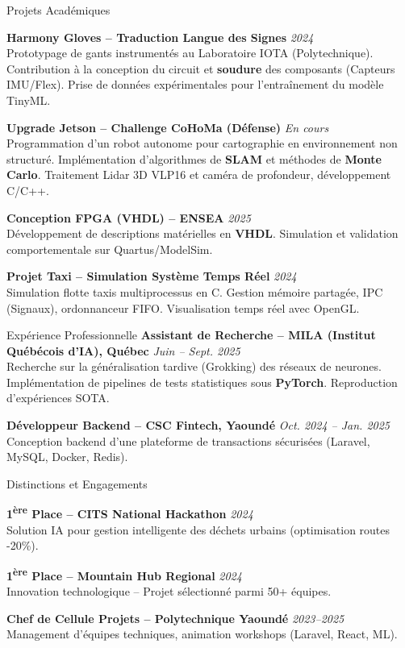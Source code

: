 \documentclass[10pt]{resume}
\begin{document}
\begin{rSection}{Projets Académiques}

{\bf Harmony Gloves -- Traduction Langue des Signes} \hfill {\em 2024}\\
Prototypage de gants instrumentés au Laboratoire IOTA (Polytechnique). Contribution à la conception du circuit et \textbf{soudure} des composants (Capteurs IMU/Flex). Prise de données expérimentales pour l'entraînement du modèle TinyML.

{\bf Upgrade Jetson -- Challenge CoHoMa (Défense)} \hfill {\em En cours}\\
Programmation d'un robot autonome pour cartographie en environnement non structuré. Implémentation d'algorithmes de \textbf{SLAM} et méthodes de \textbf{Monte Carlo}. Traitement Lidar 3D VLP16 et caméra de profondeur, développement C/C++.

{\bf Conception FPGA (VHDL) -- ENSEA} \hfill {\em 2025}\\
Développement de descriptions matérielles en \textbf{VHDL}. Simulation et validation comportementale sur Quartus/ModelSim.

{\bf Projet Taxi -- Simulation Système Temps Réel} \hfill {\em 2024}\\
Simulation flotte taxis multiprocessus en C. Gestion mémoire partagée, IPC (Signaux), ordonnanceur FIFO. Visualisation temps réel avec OpenGL.

\end{rSection}

\begin{rSection}{Expérience Professionnelle}
{\bf Assistant de Recherche -- MILA (Institut Québécois d'IA), Québec} \hfill {\em Juin -- Sept. 2025}\\
Recherche sur la généralisation tardive (Grokking) des réseaux de neurones. Implémentation de pipelines de tests statistiques sous \textbf{PyTorch}. Reproduction d'expériences SOTA.

{\bf Développeur Backend -- CSC Fintech, Yaoundé} \hfill {\em Oct. 2024 -- Jan. 2025}\\
Conception backend d'une plateforme de transactions sécurisées (Laravel, MySQL, Docker, Redis).
\end{rSection}

\begin{rSection}{Distinctions et Engagements}

\textbf{1\textsuperscript{ère} Place -- CITS National Hackathon} \hfill \textit{2024} \\
Solution IA pour gestion intelligente des déchets urbains (optimisation routes -20\%).

\textbf{1\textsuperscript{ère} Place -- Mountain Hub Regional} \hfill \textit{2024} \\
Innovation technologique -- Projet sélectionné parmi 50+ équipes.

\textbf{Chef de Cellule Projets -- Polytechnique Yaoundé} \hfill \textit{2023--2025} \\
Management d'équipes techniques, animation workshops (Laravel, React, ML).
\end{rSection}
\end{document}
